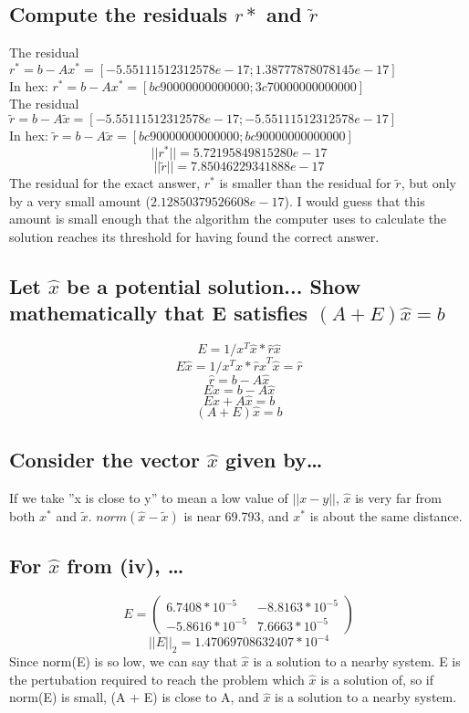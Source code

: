 \documentclass[11pt]{modart}
\begin{document}
\subsection{Compute the residuals $r*$ and $\tilde{r}$}
The residual $r^* = b-Ax^*=[-5.55111512312578e-17; 1.38777878078145e-17]$\\
In hex: $r^* = b-Ax^*=[bc90000000000000; 3c70000000000000]$\\
The residual $\tilde{r} = b-A\tilde{x}=[-5.55111512312578e-17; -5.55111512312578e-17]$\\
In hex: $\tilde{r} = b-A\tilde{x}=[bc90000000000000; bc90000000000000]$\\

$$||r^*||=5.72195849815280e-17$$
$$||\tilde{r}||=7.85046229341888e-17$$
The residual for the exact answer, $r^*$ is smaller than the residual for $\tilde{r}$, but only by a very small amount ($2.12850379526608e-17$).
I would guess that this amount is small enough that the algorithm the computer uses to calculate the solution reaches its threshold for having found the correct answer.

\subsection{Let $\hat{x}$ be a potential solution... 
Show mathematically that E satisfies $(A+E)\hat{x}=b$}
\[E = 1/x^T\hat{x}*\hat{r}\hat{x}\]
\[E\hat{x} = 1/x^T\hat{x}*\hat{r}\hat{x}^T\hat{x}=\hat{r}\]
\[\hat{r} = b-A\hat{x}\]
\[E\hat{x} = b-A\hat{x}\]
\[E\hat{x} + A\hat{x}= b\]
\[(A + E)\hat{x}= b\]

\subsection{Consider the vector $\hat{x}$ given by\ldots}
If we take ''x is close to y'' to mean a low value of $||x-y||$,
$\hat{x}$ is very far from both $x^*$ and $\tilde{x}$.
$norm(\hat{x} - \tilde{x})$ is near 69.793, and $x^*$ is about the same distance.

\subsection{For $\hat{x}$ from (iv), \ldots}

  \[E=
    \left(
    \begin{array}{cc}
      6.7408*10^{-5} & -8.8163*10^{-5}\\
      -5.8616*10^{-5} &  7.6663*10^{-5} \end{array}
      \right)\]
      \[||E||_2=1.47069708632407*10^{-4}\]
Since norm(E) is so low, we can say that $\hat{x}$ is a solution to a nearby system.
E is the pertubation required to reach the problem which $\hat{x}$ is a solution of,
so if norm(E) is small, (A + E) is close to A, and $\hat{x}$ is a solution to a nearby system.
  
\end{document}
